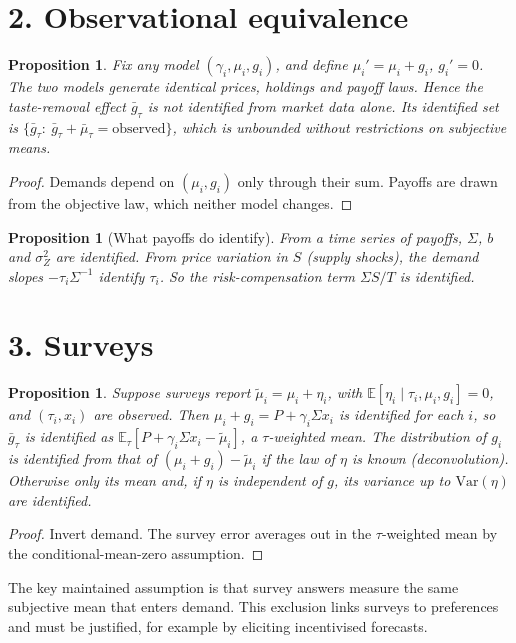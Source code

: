 \documentclass[11pt]{article}
\newtheorem{proposition}[theorem]{Proposition}
\theoremstyle{definition}
\begin{document}
\section*{2. Observational equivalence}
\begin{proposition}\label{prop:oe}
Fix any model $(\gamma_i,\mu_i,g_i)$, and define $\mu_i'=\mu_i+g_i$, $g_i'=0$. The two models generate identical prices,
holdings and payoff laws. Hence the taste-removal effect $\bar g_\tau$ is not identified from market data alone. Its
identified set is $\{\bar g_\tau:\ \bar g_\tau+\bar\mu_\tau=\text{observed}\}$, which is unbounded without restrictions on
subjective means.
\end{proposition}
\begin{proof}
Demands depend on $(\mu_i,g_i)$ only through their sum. Payoffs are drawn from the objective law, which neither model changes.
\end{proof}
\begin{proposition}[What payoffs do identify]\label{prop:cov}
From a time series of payoffs, $\Sigma$, $b$ and $\sigma_Z^2$ are identified. From price variation in $S$ (supply shocks), the
demand slopes $-\tau_i\Sigma^{-1}$ identify $\tau_i$. So the risk-compensation term $\Sigma S/T$ is identified.
\end{proposition}

\section*{3. Surveys}
\begin{proposition}\label{prop:survey}
Suppose surveys report $\tilde\mu_i=\mu_i+\eta_i$, with $\mathbb E[\eta_i\mid\tau_i,\mu_i,g_i]=0$, and $(\tau_i,x_i)$ are
observed. Then $\mu_i+g_i=P+\gamma_i\Sigma x_i$ is identified for each $i$, so $\bar g_\tau$ is identified as
$\mathbb E_\tau[P+\gamma_i\Sigma x_i-\tilde\mu_i]$, a $\tau$-weighted mean. The distribution of $g_i$ is identified from
that of $(\mu_i+g_i)-\tilde\mu_i$ if the law of $\eta$ is known (deconvolution). Otherwise only its mean and, if $\eta$
is independent of $g$, its variance up to $\mathrm{Var}(\eta)$ are identified.
\end{proposition}
\begin{proof}
Invert demand. The survey error averages out in the $\tau$-weighted mean by the conditional-mean-zero assumption.
\end{proof}
The key maintained assumption is that survey answers measure the same subjective mean that enters demand. This exclusion
links surveys to preferences and must be justified, for example by eliciting incentivised forecasts.
\end{document}
